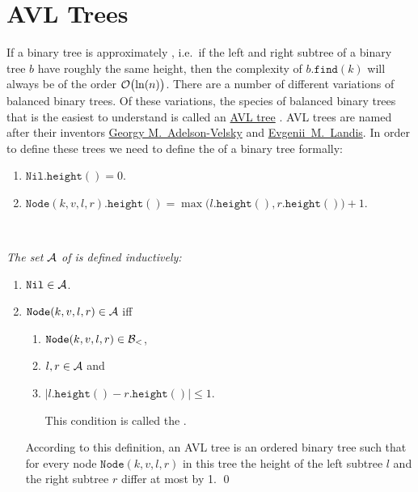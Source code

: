\section{AVL Trees}
If a binary tree is approximately , i.e.~if the left and right subtree of a binary tree $b$  have
roughly the same height, then the complexity of $b.\mathtt{find}(k)$ will always be of the order
$\mathcal{O}\bigl(\ln(n)\bigr)$.  There are a number of different variations of
balanced binary trees.  Of these variations, the species of balanced binary trees that is the easiest to understand is
called an \href{https://en.wikipedia.org/wiki/AVL_tree}{AVL tree} \cite{adelson:62}.  AVL trees are 
named after their inventors \href{https://en.wikipedia.org/wiki/Georgy_Adelson-Velsky}{Georgy M.~Adelson-Velsky} 
and \href{https://en.wikipedia.org/wiki/Evgenii_Landis}{Evgenii~M.~Landis}.  In order to define these 
trees we need to define the  of a binary tree formally:
\begin{enumerate}
\item $\mathtt{Nil}.\mathtt{height}() = 0$.
\item $\mathtt{Node}(k,v,l,r).\mathtt{height}() = 
       \max\bigl( l.\mathtt{height}(), r.\mathtt{height}() \bigr) + 1$. \eox
\end{enumerate}

\begin{Definition} \hspace*{\fill} \\
{\em 
  The set $\mathcal{A}$ of  is defined inductively:
  \begin{enumerate}
  \item $\mathtt{Nil} \in \mathcal{A}$.
  \item $\mathtt{Node}(k,v,l,r) \in \mathcal{A}$ \quad iff 
        \begin{enumerate}
        \item $\mathtt{Node}(k,v,l,r) \in \mathcal{B}_<$,
        \item $l, r \in \mathcal{A}$ \quad and
        \item $|l.\mathtt{height}() - r.\mathtt{height}()| \leq 1$.

              This condition is called the .
        \end{enumerate}
        According to this definition, an AVL tree is an ordered binary tree such that for every node
        $\mathtt{Node}(k,v,l,r)$ in this tree the height of the left subtree $l$ and the right
        subtree  $r$ differ at most by 1.  \qed
  \end{enumerate}
}  
\end{Definition}

